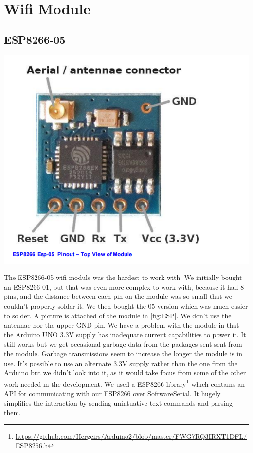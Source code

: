 \documentclass[a4paper,12pt,oneside,openright,titlepage]{book}
\newcommand\citeurl[2]{%
  \href{#1}{#2}\footnote{\url{#1}}%
}
\begin{document}
\section{Wifi Module}
\subsection{ESP8266-05}
\begin{center}
	\includegraphics[scale=0.3]{ESP8266}
\end{center}

The ESP8266-05 wifi module was the hardest to work with. We initially bought an ESP8266-01, but that was even more complex to work with, because it had 8 pins, and the distance between each pin on the module was so small that we couldn't properly solder it. We then bought the 05 version which was much easier to solder. A picture is attached of the module in \ref{fig:ESP}. We don't use the antennae nor the upper GND pin. We have a problem with the module in that the Arduino UNO 3.3V supply has inadequate current capabilities to power it. It still works but we get occasional garbage data from the packages sent sent from the module. Garbage transmissions seem to increase the longer the module is in use. It's possible to use an alternate 3.3V supply rather than the one from the Arduino but we didn't look into it, as it would take focus from some of the other work needed in the development. We used a \citeurl{https://github.com/Hergeirs/Arduino2/blob/master/FWG7RQ3IRXT1DFL/ESP8266.h}{ESP8266 library} which contains an API for communicating with our ESP8266 over SoftwareSerial. It hugely simplifies the interaction by sending unintuative text commands and parsing them.
\end{document}

